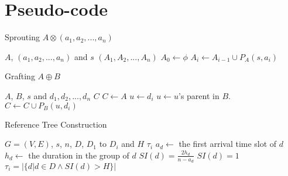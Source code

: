 \documentclass[10pt, conference, letterpaper]{IEEEtran}
\theoremstyle{definition}
\newcounter{procedure}
\begin{document}


\appendices

\section{Pseudo-code}\label{sec: pseudo-code}

\begin{procedure} [h] \small
	\selectfont \caption{Sprouting $A\otimes (a_{1},a_{2},...,a_{n})$}
	\begin{algorithmic} [1]
		\REQUIRE  $A$, $(a_{1},a_{2},...,a_{n})$ and $s$
		\ENSURE  $(A_{1},A_{2},...,A_{n})$
		\STATE  $A_{0}\leftarrow \phi$
			\STATE  $A_{i}\leftarrow A_{i-1}\cup P_{A}(s,a_{i})$
		\ENDFOR  
	\end{algorithmic}
\end{procedure}

\begin{procedure} [h] \small
	\selectfont \caption{Grafting $A\oplus B$}
	\begin{algorithmic} [1]
		\REQUIRE  $A$, $B$, $s$ and $d_{1}, d_{2}, ..., d_{n}$
		\ENSURE  $C$
		\STATE  $C\leftarrow A$
			\STATE  $u \leftarrow d_{i}$
				\STATE  $u\leftarrow u$'s parent in $B$.
			\ENDWHILE  
			\STATE  $C\leftarrow C\cup P_{B}(u,d_{i})$
		\ENDFOR  
	\end{algorithmic}
\end{procedure}

\begin{procedure} [h] \small
	\selectfont \caption{Reference Tree Construction}
	\begin{algorithmic} [1]
		\REQUIRE  $G=(V,E)$, $s$, $n$, $D$, $D_{1}$ to $D_{i}$ and $H$
		\ENSURE  $\tau_{i}$
			\STATE  $a_{d} \leftarrow$ the first arrival time slot of $d$
			\STATE  $h_{d} \leftarrow$ the duration in the group of $d$
				\STATE $SI(d)=\frac{2h_{d}}{n-a_{d}}$
				\STATE  $SI(d)=1$
			\ENDIF  
		\ENDFOR  
		\STATE  $\tau_i=|\{d| d\in D \wedge SI(d)> H\}|$
	\end{algorithmic}
\end{procedure}
\end{document}
